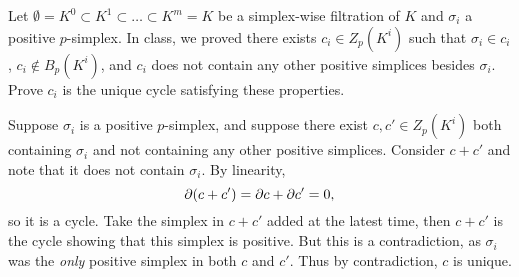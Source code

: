 \documentclass[twoside,10pt]{article}
\begin{document}
\newpage

\begin{exer}
	Let $\emptyset = K^0 \subset K^1 \subset \dots \subset K^m = K$ be a simplex-wise filtration of $K$ and $\sigma_i$ a positive $p$-simplex. In class, we proved there exists $c_i \in Z_p(K^i)$ such that $\sigma_i \in c_i$, $c_i \not\in B_p(K^i)$, and $c_i$ does not contain any other positive simplices besides $\sigma_i$. Prove $c_i$ is the unique cycle satisfying these properties. 
\end{exer}

Suppose $\sigma_i$ is a positive $p$-simplex, and suppose there exist $c,c' \in Z_{p}(K^{i})$ both containing $\sigma_i$ and not containing any other positive simplices. Consider $c+c'$ and note that it does not contain $\sigma_i$. By linearity,
\[
	\partial(c+c') = \partial c + \partial c' = 0,
\] so it is a cycle. Take the simplex in $c+c'$ added at the latest time, then $c+c'$ is the cycle showing that this simplex is positive. But this is a contradiction, as $\sigma_i$ was the \textit{only} positive simplex in both $c$ and $c'$. Thus by contradiction, $c$ is unique.
\end{document}
